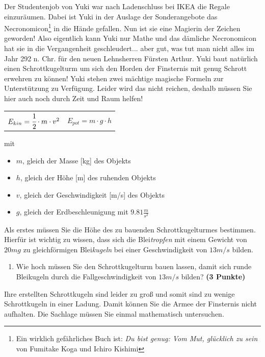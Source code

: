 \documentclass[a4paper, 9pt]{scrartcl}\usepackage[]{graphicx}\usepackage[]{xcolor}
\begin{document}
Der Studentenjob von Yuki war nach Ladenschluss bei IKEA die Regale einzuräumen. Dabei ist Yuki in der Auslage der Sonderangebote das Necronomicon\footnote{Ein wirklich gefährliches Buch ist: \textit{Du bist genug: Vom Mut, glücklich zu sein} von Fumitake Koga und Ichiro Kishimi} in die Hände gefallen. Nun ist sie eine Magierin der Zeichen geworden! Also eigentlich kann Yuki nur Mathe und das dämliche Necronomicon hat sie in die Vergangenheit geschleudert... aber gut, was tut man nicht alles im Jahr 292 n. Chr. für den neuen Lehnsherren Fürsten Arthur. Yuki baut natürlich einen Schrottkugelturm um sich den
Horden der Finsternis mit genug Schrott erwehren zu können! Yuki stehen zwei mächtige magische Formeln zur Unterstützung zu Verfügung. Leider wird das nicht reichen, deshalb müssen Sie hier auch noch durch Zeit und Raum helfen!

\begin{center}
  \begin{tabular}{cc}
    $E_{kin} = \cfrac{1}{2}\cdot m \cdot v^2$ & $E_{pot} = m \cdot g \cdot h$\\
  \end{tabular}
\end{center}

mit

\begin{itemize}[noitemsep]
\item $m$, gleich der Masse [kg] des Objekts
\item $h$, gleich der Höhe [m] des ruhenden Objekts
\item $v$, gleich der Geschwindigkeit [m/s] des Objekts
\item $g$, gleich der Erdbeschleunigung mit $9.81 \tfrac{m}{s^2}$ 
\end{itemize}

Als erstes müssen Sie die Höhe des zu bauenden Schrottkugelturmes bestimmen. Hierfür ist wichtig zu wissen, dass sich die Blei\textit{tropfen} mit einem Gewicht von $20mg$ zu gleichförmigen Blei\textit{kugeln} bei einer Geschwindigkeit von $13m/s$ bilden.

\begin{enumerate}
\item Wie hoch müssen Sie den Schrottkugelturm bauen lassen, damit sich runde Bleikugeln durch die Fallgeschwindigkeit von $13m/s$ bilden? \textbf{(3 Punkte)}
\end{enumerate}

Ihre erstellten Schrottkugeln sind leider zu gro{\ss} und somit sind zu wenige Schrottkugeln in einer Ladung. Damit können Sie die Armee der Finsternis nicht aufhalten. Die Sachlage müssen Sie einmal mathematisch untersuchen.
\end{document}
